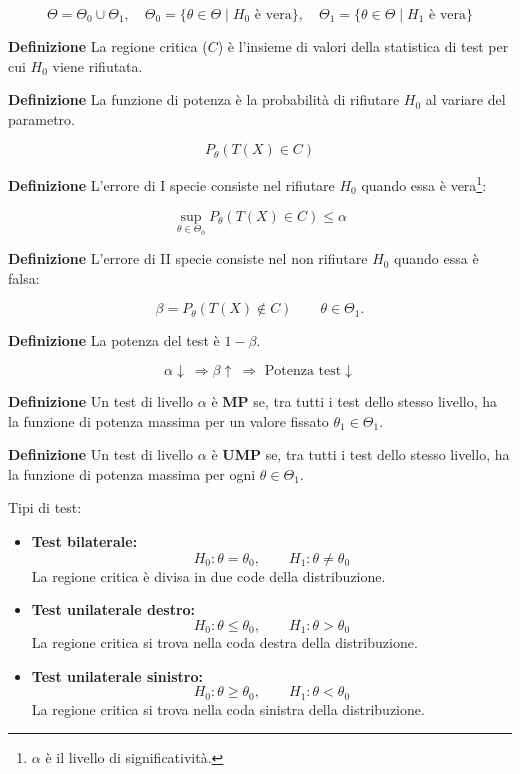 \documentclass{article}
\newcommand{\df}{\noindent\textbf{Definizione} }
\begin{document}
\[
    \Theta=\Theta_0 \cup \Theta_1,\quad \Theta_0=\{\theta\in\Theta\mid H_0\text{ è vera}\},\quad \Theta_1=\{\theta\in\Theta\mid H_1\text{ è vera}\}
\]

\vspace{8pt}

\df La regione critica ($C$) è l'insieme di valori della statistica di test per cui $H_0$ viene rifiutata.\newline

\df La funzione di potenza è la probabilità di rifiutare $H_0$ al variare del parametro.

\[
P_\theta(T(X)\in C)
\]\newline

\df L'errore di I specie consiste nel rifiutare $H_0$ quando essa è vera\footnote{$\alpha$ è il livello di significatività.}:

\[
\sup_{\theta\in\Theta_0}P_\theta(T(X)\in C)\leq\alpha
\]\newline

\df L'errore di II specie consiste nel non rifiutare $H_0$ quando essa è falsa:

\[
\beta
=
P_\theta(T(X)\notin C)
\qquad
\theta\in\Theta_1.
\]\newline

\df La potenza del test è $1-\beta$.\newline

\[
\boxed{\alpha\downarrow\ \Rightarrow\beta\uparrow\ \Rightarrow\text{ Potenza test}\downarrow}
\]\newline

\df Un test di livello $\alpha$ è \textbf{MP} se, tra tutti i test dello stesso livello, ha la funzione di potenza massima per un valore fissato $\theta_1\in\Theta_1$.\newline

\df Un test di livello $\alpha$ è \textbf{UMP} se, tra tutti i test dello stesso livello, ha la funzione di potenza massima per ogni $\theta\in\Theta_1$.\newpage

Tipi di test:
\begin{itemize}
    \item \textbf{Test bilaterale:}
    \[
    H_0:\theta=\theta_0,
    \qquad
    H_1:\theta\neq\theta_0
    \]
    La regione critica è divisa in due code della distribuzione.

    \item \textbf{Test unilaterale destro:}
    \[
    H_0:\theta\leq\theta_0,
    \qquad
    H_1:\theta>\theta_0
    \]
    La regione critica si trova nella coda destra della distribuzione.

    \item \textbf{Test unilaterale sinistro:}
    \[
    H_0:\theta\geq\theta_0,
    \qquad
    H_1:\theta<\theta_0
    \]
    La regione critica si trova nella coda sinistra della distribuzione.\newline
\end{itemize}
\end{document}
